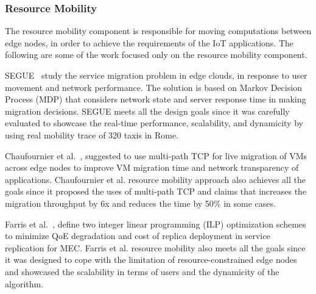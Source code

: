 \subsubsection{Resource Mobility}
The resource mobility component is responsible for moving computations between edge nodes, in order to achieve the requirements of the IoT applications. The following are some of the work focused only on the resource mobility component.

SEGUE~\cite{SEGUE} study the service migration problem in edge clouds, in response to user movement and network performance. The solution is based on Markov Decision Process (MDP) that considers network state and server response time in making migration decisions. SEGUE meets all the design goals since it was carefully evaluated to showcase the real-time performance, scalability, and dynamicity by using real mobility trace of 320 taxis in Rome. 

Chaufournier et al.~\cite{Chaufournier:2017}, suggested to use multi-path TCP for live migration of VMs across edge nodes to improve VM migration time and network transparency of applications.  Chaufournier et al. resource mobility approach also achieves all the goals since it proposed the uses of multi-path TCP and claims that increases the migration throughput by 6x and reduces the time by 50\% in some cases.

Farris et al.~\cite{Farris:2017}, define two integer linear programming (ILP) optimization schemes to minimize QoE degradation and cost of replica deployment in service replication for MEC. Farris et al. resource mobility also meets all the goals since it was designed to cope with the limitation of resource-constrained edge nodes and showcased the scalability in terms of users and the dynamicity of the algorithm.

